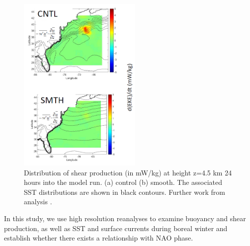 \begin{figure}[h]
	\centering
	\includegraphics[width=14pc]{Arnaud_plot.PNG}
	\caption{Distribution of shear production (in mW/kg) at height z=4.5 km 24 hours into the model run. (a) control (b) smooth. The associated SST distributions are shown in black contours. Further work from analysis \citet{sheldon2017warm}.}
	\label{fig:Sheldon} 
\end{figure}


In this study, we use high resolution reanalyses to examine buoyancy and shear production, as well as SST and surface currents during boreal winter and establish whether there exists a relationship with NAO phase.



